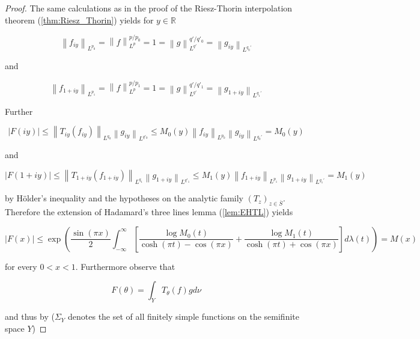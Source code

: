 \begin{proof}
	The same calculations as in the proof of the Riesz-Thorin interpolation theorem (\ref{thm:Riesz_Thorin}) yields for $y \in \mathbb{R}$

	\begin{equation*}
		\left\| f_{iy}\right\|_{L^{p_0}} = \left\| f\right\|^{p/p_0}_{L^p} = 1 = \left\| g\right\|_{L^{q'}}^{q'/q'_0} = \left\| g_{iy}\right\|_{L^{q_0'}}
	\end{equation*}

	and

	\begin{equation*}
		\left\| f_{1 + iy}\right\|_{L^{p_1}} = \left\| f\right\|^{p/p_1}_{L^p} = 1 = \left\| g\right\|_{L^{q'}}^{q'/q'_1} = \left\| g_{1 + iy}\right\|_{L^{q_1'}}
	\end{equation*}

	Further

	\begin{equation*}
		\left| F(iy)\right| \leqslant \left\| T_{iy}(f_{iy})\right\|_{L^{q_0}} \left\| g_{iy}\right\|_{L^{q'_0}} \leqslant M_0(y) \left\|f_{iy}\right\|_{L^{p_0}}\left\| g_{iy}\right\|_{L^{q_0'}} = M_0(y)
	\end{equation*}

	and

	\begin{equation*}
		\left| F(1 + iy)\right| \leqslant \left\| T_{1 + iy}(f_{1 + iy})\right\|_{L^{q_1}} \left\| g_{1 + iy}\right\|_{L^{q'_1}} \leqslant M_1(y) \left\|f_{1 + iy}\right\|_{L^{p_1}}\left\| g_{1 + iy}\right\|_{L^{q_1'}} = M_1(y)
	\end{equation*}

	by H\"older's inequality and the hypotheses on the analytic family $(T_z)_{z \in \overline{S}}$. Therefore the extension of Hadamard's three lines lemma (\ref{lem:EHTL}) yields

	\begin{equation*}
		\left| F(x) \right| \leqslant \exp\left( \frac{\sin(\pi x)}{2} \int_{-\infty}^\infty \left[ \frac{\log M_0(t)}{\cosh(\pi t) - \cos(\pi x)} + \frac{\log M_1(t)}{\cosh(\pi t) + \cos(\pi x)}\right] d\lambda(t) \right) = M(x)
	\end{equation*}

	for every $0 < x < 1$. Furthermore observe that

	\begin{equation*}
		F(\theta) = \int_Y T_\theta(f)gd\nu
	\end{equation*}

	and thus by \cite[189]{folland:real_analysis:1999} ($\Sigma_Y$ denotes the set of all finitely simple functions on the semifinite space $Y$)


\end{proof}

